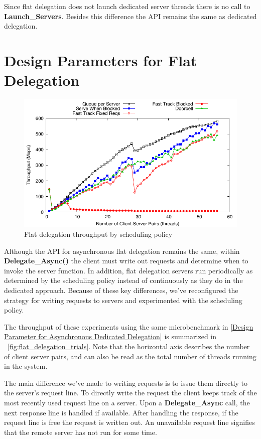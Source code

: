 \documentclass{uicthesi}
\begin{document}
Since flat delegation does not launch dedicated server threads there is no call to \textbf{Launch\_Servers}. Besides this difference the API remains the same as dedicated delegation. 

\section{Design Parameters for Flat Delegation}  

\begin{figure}[ht!]
\centering
\includegraphics[width=0.9\columnwidth]{FIG/flat_delegation_strategy.pdf}
\caption{Flat delegation throughput by scheduling policy}
\label{fig:flat_delegation_strategy}
\end{figure}

Although the API for asynchronous flat delegation remains the same, within \textbf{Delegate\_Async()} the client must write out requests and determine when to invoke the server function. In addition, flat delegation servers run periodically as determined by the scheduling policy instead of continuously as they do in the dedicated approach. Because of these key differences, we've reconfigured the strategy for writing requests to servers and experimented with the scheduling policy. 

The throughput of these experiments using the same microbenchmark in \ref{Design Parameter for Asynchronous Dedicated Delegation} is summarized in ~\ref{fig:flat_delegation_trials}. Note that the horizontal axis describes the number of client server pairs, and can also be read as the total number of threads running in the system. 

The main difference we've made to writing requests is to issue them directly to the server's request line. To directly write the request the client keeps track of the most recently used request line on a server. Upon a \textbf{Delegate\_Async} call, the next response line is handled if available. After handling the response, if the request line is free the request is written out. An unavailable request line signifies that the remote server has not run for some time. 
\end{document}
